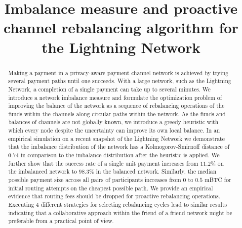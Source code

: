 \documentclass[conference]{IEEEtran}
\begin{document}
 
\title{Imbalance measure and proactive channel rebalancing algorithm for the Lightning Network}
\author{
\and
{}
}

\maketitle 
\begin{abstract}
Making a payment in a privacy-aware payment channel network is achieved by trying several payment paths until one succeeds.
With a large network, such as the Lightning Network, a completion of a single payment can take up to several minutes.
We introduce a network imbalance measure and formulate the optimization problem of improving the balance of the network as a sequence of rebalancing operations of the funds within the channels along circular paths within the network.
As the funds and balances of channels are not globally known, we introduce a greedy heuristic with which every node despite the uncertainty can improve its own local balance.
In an empirical simulation on a recent snapshot of the Lightning Network we demonstrate that the imbalance distribution of the network has a Kolmogorov-Smirnoff distance of $0.74$ in comparison to the imbalance distribution after the heuristic is applied.
We further show that the success rate of a single unit payment increases from $11.2\%$ on the imbalanced network to $98.3\%$ in the balanced network.
 Similarly, the median possible payment size across all pairs of participants increases from $0$ to $0.5$ mBTC for initial routing attempts on the cheapest possible path.
We provide an empirical evidence that routing fees should be dropped for proactive rebalancing operations.
Executing $4$ different strategies for selecting rebalancing cycles lead to similar results 
indicating that a collaborative approach within the friend of a friend network might be preferable from a practical point of view.
\end{abstract}
\end{document}
